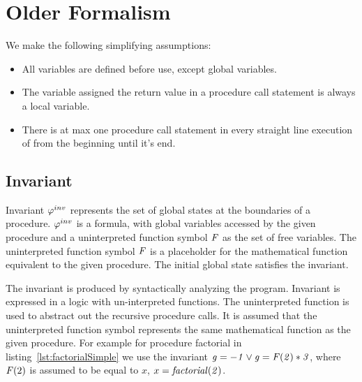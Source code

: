 \section{Older Formalism}

We make the following simplifying assumptions:
\begin{itemize}
\item All variables are defined before use, except global variables.
\item The variable assigned the return value in a procedure call
  statement is always a local variable.
\item There is at max one procedure call statement in every straight line
  execution of \foo from the beginning until it's
  end.
  \end{itemize}

\subsection{Invariant}\label{sec:invariant}

\begin{definition}[invariant]
  Invariant $\varphi^{inv}$ represents the set of
  global states at the boundaries of a procedure. $\varphi^{inv}$ is a formula,
  with global variables accessed by the given procedure and a
  uninterpreted function symbol $\mathit{F}$ as the set of free variables. The
  uninterpreted function symbol $\mathit{F}$ is a placeholder for the
  mathematical function equivalent to the given procedure. The initial
  global state satisfies the invariant.
\end{definition}

The invariant is produced by syntactically analyzing the
program. Invariant is expressed in a logic with un-interpreted
functions. The uninterpreted function is used to abstract out the
recursive procedure calls. It is assumed that the uninterpreted
function symbol represents the same mathematical function as the given
procedure. For example for procedure factorial in
listing~\ref{lst:factorialSimple} we use the invariant $\mathit{g = -1
  \vee g = \mathit{F}(2) * 3}$, where $\mathit{F}(2)$ is assumed to be equal to $x$,
$x = \mathit{factorial(2)}$.

